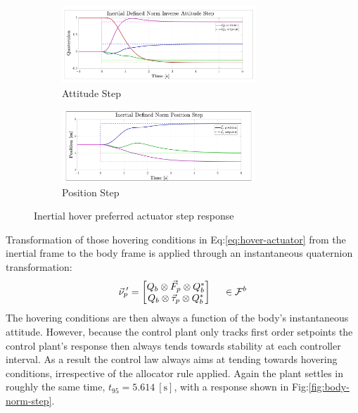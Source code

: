 \begin{figure}[hbtp]
\vspace{-12pt}
\centering
\begin{subfigure}{\textwidth}
\centering
\includegraphics[width=0.8\textwidth]{graphs/inertial_norm_attitude}
\vspace{-12pt}
\caption{Attitude Step}
\label{fig:inertial_norm_attitude}
\end{subfigure}
\begin{subfigure}{\textwidth}
\vspace{-2pt}
\centering
\includegraphics[width=0.8\textwidth]{graphs/inertial_norm_position}
\vspace{-6pt}
\caption{Position Step}
\label{fig:inertia_norm_position}
\vspace{-8pt}
\end{subfigure}
\caption{Inertial hover preferred actuator step response}
\label{fig:inertial-norm-step}
\vspace{-18pt}
\end{figure}
\par
Transformation of those hovering conditions in Eq:\ref{eq:hover-actuator} from the inertial frame to the body frame is applied through an instantaneous quaternion transformation:
\begin{equation}
\vec{\nu}_p\text{}\hspace{-2pt}'=\begin{bmatrix}
Q_b\otimes\vec{F}_p\otimes Q_b^*\\
Q_b\otimes\vec{\tau}_p\otimes Q_b^*
\end{bmatrix}~~~~\in\mathcal{F}^{b}
\end{equation}
The hovering conditions are then always a function of the body's instantaneous attitude. However, because the control plant only tracks first order setpoints the control plant's response then always tends towards stability at each controller interval. As a result the control law always aims at tending towards hovering conditions, irrespective of the allocator rule applied. Again the plant settles in roughly the same time, $t_{95}=5.614~[\text{s}]$, with a response shown in Fig:\ref{fig:body-norm-step}.
